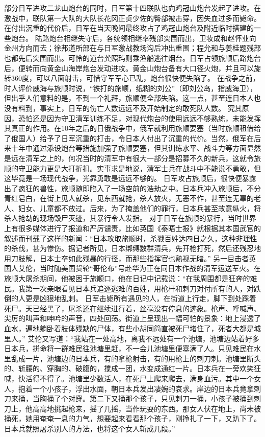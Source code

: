 \documentclass[12pt,UTF8]{ctexbook}
\begin{document}
部分日军进攻二龙山炮台的同时，日军第十四联队也向鸡冠山炮台发起了进攻。在激战中，联队第一大队的大队长花冈正贞少佐的臀部被击穿，因失血过多而毙命。在付出沉重的代价后，日军在当天晚间最终攻占了鸡冠山炮台及附近临时搭建的一些炮台。
陆路炮台相继失守后，各统领相继率残部突围而出，卫妆成和赵怀业向金州方向而去；徐邦道所部在与日军激战教场沟后冲出重围；程允和与姜桂题残部也都先后突围而出。可怜的道台龚照玙则乘渔船逃往烟台。日军占领旅顺后路炮台后，便转而向黄金山海岸炮台发动进攻。黄金山炮台备有大口径火炮，并且可以旋转360度，可以八面射击，可惜守军军心已乱，炮台很快便失陷了。
在战争之前，时人评价威海与旅顺时说，“铁打的旅顺，纸糊的刘公”（即刘公岛，指威海卫），但出乎人们意料的是，不到一个礼拜，旅顺便全部失陷。这一点，甚至连日本人也没有料到，事实上，日军的伤亡人数远远不及开始制定的敢死队人数。
究其原因，恐怕还是因为守卫清军训练不足，对现代炮台的使用远远不够熟练，未能发挥其真正的作用。在10年之后的日俄战争中，俄军就利用旅顺要塞（当时旅顺租借给了俄国人）给予了日军沉重的打击，令日本人付出了沉重的代价。当然，俄军在后来十年中通过添设炮台等措施加强了旅顺要塞，但其训练水平、战斗力等方面显然是远在清军之上的，何况当时的清军中有很大一部分是招募不久的新兵，这就令旅顺的守卫能力更是大打折扣。实事求是地说，清军士兵在战斗中不能说不勇敢，但这毕竟是一场现代战争，光靠勇敢是远远不够的。
日军攻占旅顺后，很快便暴露出了疯狂的兽性，旅顺随即陷入了一场空前的浩劫之中。日本兵冲入旅顺后，不分青红皂白，在街上见人就杀，见东西就抢，杀人放火，无恶不作，甚至连无辜的老人、妇女、儿童都不放过。后来，为了掩盖他们的罪行，日本兵甚至故意纵火，将杀人抢劫的现场毁尸灭迹，其暴行令人发指。
对于日军在旅顺的暴行，当时世界上有很多媒体进行了报道和严厉谴责，比如英国《泰晤士报》就根据其本国武官的叙述而刊载了这样的新闻：“日本攻取旅顺时，杀戮百姓达四日之久，这种非理性的杀伐，甚为惨伤。据记者所见，日本绑缚数群清兵，先开枪打死，然后还残忍地用刀肢解，日本士卒如此残暴的行径，而那些指挥官也熟视无睹。”
另一目击者英国人艾伦，当时随美国货轮“哥伦布”号赴华为正在同日本作战的清军运送军火。在旅顺大屠杀期间，他被困于旅顺口，他在日记中记载说：“在我周围都是狂奔的难民。我第一次亲眼看见日本兵追逐逃难的百姓，用枪杆和刺刀对付所有的人，对跌倒的人更是凶狠地乱刺。
日军击毙所有遇见的人，在街道上行走，脚下到处踩着死尸。天已经黑了，屠杀还在继续进行着，丝亳没有停息的迹象。枪声、呼喊声、尖厉的叫声和呻吟的声音，四处回荡。街道上呈现出一幅可怕的景象：地上浸透了血水，遍地躺卧着肢体残缺的尸体，有些小胡同简直被死尸堵住了，死者大都是城里人。”
艾伦又写道：“我站在一处高地，离我不远处有一个池塘，池塘边站着好多日本兵，拼命将一群难民往池塘里赶，不一会儿池塘里便塞满了人。只见难民在水里乱成一片，池塘边的日本兵，有的拿枪射击，有的用枪上的刺刀刺。池塘里断头的、斩腰的、穿胸的、破腹的，搅成一团，水变成通红一片。日本兵在一旁欢笑狂喊，快活得不得了。池塘里少数活人，在死尸上爬来爬去，满身血污。其中一个女人，抱着一个小孩子，浮出水面，朝日本兵发出凄婉的哀求。岸边的日本兵竟拿刺刀来捅，当胸捅了个对穿。第二下又捅那个孩子，只见刺刀一捅，小孩子被捅到刺刀上，他高高地挑起枪来，摇了几摇，当作玩耍的东西。那女人伏在地上，尚未被捅死，她用奄奄一息的力气，想要起来看看那个孩子，刚挣扎了一下，又趴下了。日本兵就照屠杀别人的方法，也将这个女人斩成几段。”
\end{document}
